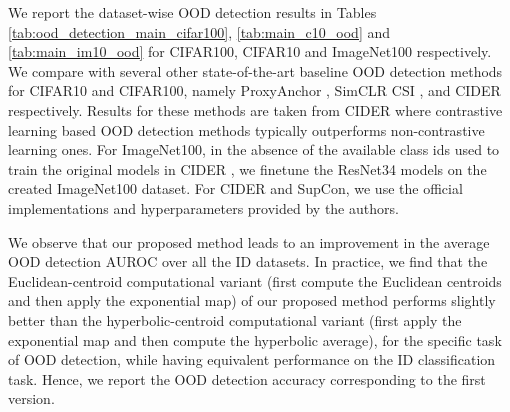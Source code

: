 \begin{table}[ht]
\caption{Results on ImageNet100. OOD detection performance for {ResNet-34} trained on ImageNet100. Training with \texttt{HypStructure} achieves strong OOD detection performance.}
\centering
{}
\label{tab:main_im10_ood}
\end{table}


We report the dataset-wise OOD detection results in Tables \ref{tab:ood_detection_main_cifar100}, \ref{tab:main_c10_ood} and \ref{tab:main_im10_ood} for CIFAR100, CIFAR10 and ImageNet100 respectively. 
We compare with several other state-of-the-art baseline OOD detection methods for CIFAR10 and CIFAR100, namely ProxyAnchor \citep{kim2020proxy}, SimCLR \citep{chen2020simple} CSI \citep{tack2020csi}, and CIDER \citep{cider2022ming} respectively. Results for these methods are taken from CIDER \citep{cider2022ming} where contrastive learning based OOD detection methods typically outperforms non-contrastive learning ones. For ImageNet100, in the absence of the available class ids used to train the original models in CIDER \citep{cider2022ming}, we finetune the ResNet34 models on the created ImageNet100 dataset. For CIDER and SupCon, we use the official implementations and hyperparameters provided by the authors. 

We observe that our proposed method leads to an improvement in the average OOD detection AUROC over all the ID datasets. In practice, we find that the Euclidean-centroid computational variant (first compute the Euclidean centroids and then apply the exponential map) of our proposed method performs slightly better than the hyperbolic-centroid computational variant (first apply the exponential map and then compute the hyperbolic average), for the specific task of OOD detection, while having equivalent performance on the ID classification task. Hence, we report the OOD detection accuracy corresponding to the first version. 


